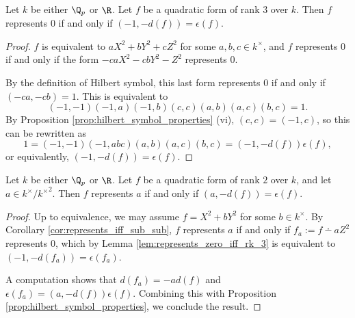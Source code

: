 \begin{lemma}\label{lem:represents_zero_iff_rk_3}
\leanok
{}
Let $k$ be either $\Q_p$ or $\R$. Let $f$ be a quadratic form of rank $3$ over $k$. Then $f$ represents $0$ if and only if $(-1, -d(f)) = \epsilon(f)$.
\end{lemma}

\begin{proof}
\leanok
$f$ is equivalent to $aX^2 + bY^2 + cZ^2$ for some $a, b, c \in k^\times$, and $f$ represents $0$ if and only if the form $-caX^2 -cbY^2 - Z^2$ represents $0$.

By the definition of Hilbert symbol, this last form represents $0$ if and only if $(-ca, -cb) = 1$.
This is equivalent to
\[ (-1, -1)(-1, a)(-1, b)(c, c)(a, b)(a, c)(b, c) = 1. \]
By Proposition \ref{prop:hilbert_symbol_properties} (vi), $(c, c) = (-1, c)$, so this can be rewritten as
\[ 1 = (-1, -1)(-1, abc)(a, b)(a, c)(b, c) = (-1, -d(f))\epsilon(f), \]
or equivalently, $(-1, -d(f)) = \epsilon(f)$.
\end{proof}

\begin{lemma}\label{lem:represents_iff_rk_2}
\leanok
{}
Let $k$ be either $\Q_p$ or $\R$. Let $f$ be a quadratic form of rank $2$ over $k$, and let $a \in k^\times / {k^\times}^2$. Then $f$ represents $a$ if and only if $(a, -d(f)) = \epsilon(f)$.
\end{lemma}
\begin{proof}
\leanok
Up to equivalence, we may assume $f = X^2 + bY^2$ for some $b \in k^\times$. By Corollary \ref{cor:represents_iff_sub_sub}, $f$ represents $a$ if and only if $f_a := f \dotminus aZ^2$ represents $0$, which by Lemma \ref{lem:represents_zero_iff_rk_3} is equivalent to $(-1, -d(f_a)) = \epsilon(f_a)$.

A computation shows that $d(f_a) = -a d(f)$ and $\epsilon(f_a) = (a, -d(f)) \epsilon (f)$. Combining this with Proposition \ref{prop:hilbert_symbol_properties}, we conclude the result.
\end{proof}

